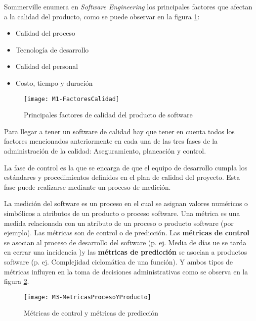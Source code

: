 Sommerville enumera en \textit{Software Engineering} \cite{sommerville_ingenierisoftware_2002} los principales factores que afectan a la calidad del producto, como se puede observar en la figura \ref{fig:M3-FactoresCalidad}:
\begin{itemize}
	\tightlist
	\item Calidad del proceso
	\item Tecnología de desarrollo
	\item Calidad del personal
	\item Costo, tiempo y duración
\end{itemize}
\begin{figure}[!h]
	\centering
	\texttt{[image: M1-FactoresCalidad]}
	\caption{Principales factores de calidad del producto de software\cite{sommerville_ingenierisoftware_2002}}\label{fig:M3-FactoresCalidad}
\end{figure}
\FloatBarrier


Para llegar a tener un software de calidad hay que tener en cuenta todos los factores mencionados anteriormente en cada una de las tres fases de la administración de la calidad: Aseguramiento, planeación y control.

La fase de control es la que se encarga de que el equipo de desarrollo cumpla los estándares y procedimientos definidos en el plan de calidad del proyecto. Esta fase puede realizarse mediante un proceso de medición.

La medición del software es un proceso en el cual se asignan valores numéricos o simbólicos a atributos de un producto o proceso software. Una métrica es una medida relacionada con un atributo de un proceso o producto software (por ejemplo). Las métricas son de control o de predicción. Las \textbf{métricas de control} se asocian al proceso de desarrollo del software (p. ej. Media de días ue se tarda en cerrar una incidencia )y las \textbf{métricas de predicción} se asocian a productos software (p. ej. Complejidad ciclomática de una función). Y ambos tipos de métricas influyen en la toma de decisiones administrativas como se observa en la figura \ref{fig:M3-MetricasProcesoYProducto}.
\begin{figure}[!h]
	\centering
	\texttt{[image: M3-MetricasProcesoYProducto]}
	\caption{Métricas de control y métricas de predicción\cite{sommerville_ingenierisoftware_2002}}\label{fig:M3-MetricasProcesoYProducto}
\end{figure}
